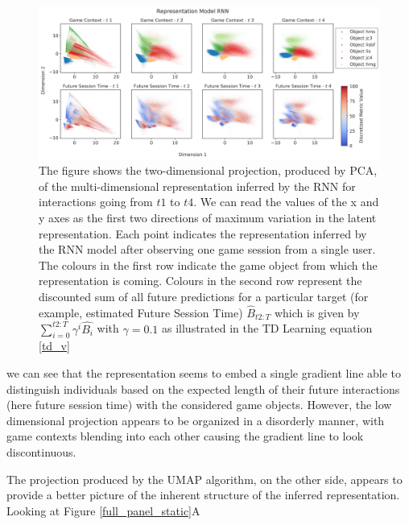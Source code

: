 \begin{figure}[!htb]
\centering
\includegraphics[width=\textwidth]{images/chapter_4/rnn_future_sess_pca.png}
\caption[\textbf{Lower dimensional representation of the latent state generated by the RNN architecture using PCA}]{The figure shows the two-dimensional projection, produced by PCA, of the multi-dimensional representation inferred by the RNN for interactions going from $t1$ to $t4$. We can read the values of the x and y axes as the first two directions of maximum variation in the latent representation. Each point indicates the representation inferred by the RNN model after observing one game session from a single user. The colours in the first row indicate the game object from which the representation is coming. Colours in the second row represent the discounted sum of all future predictions for a particular target (for example, estimated Future Session Time) $\widehat{B}_{t2:T}$ which is given by $\sum_{i=0}^{t2:T} \gamma^i\widehat{B_i}$ with $\gamma=0.1$ as illustrated in the TD Learning equation \ref{td_v}}
\label{temporal_panel_rnn_pca}
\end{figure}

we can see that the representation seems to embed a single gradient line able to distinguish individuals based on the expected length of their future interactions (here future session time) with the considered game objects. However, the low dimensional projection appears to be organized in a disorderly manner, with game contexts blending into each other causing the gradient line to look discontinuous. 

The projection produced by the UMAP algorithm, on the other side, appears to provide a better picture of the inherent structure of the inferred representation. Looking at Figure \ref{full_panel_static}A 

